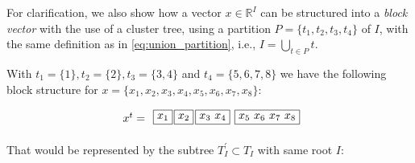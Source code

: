 For clarification, we also show how a vector $x \in \mathbb{R}^{I}$ can be structured into a \textit{block vector} with the use of a cluster tree, using a partition $P=\{t_{1}, t_{2}, t_{3}, t_{4}\}$ of $I$, with the same definition as in \ref{eq:union_partition}, i.e., $I = \bigcup_{t \in P} t$.

With $t_{1} = \{1\}, t_{2} = \{2\}, t_{3}=\{3,4\}$ and $t_{4}=\{5,6,7,8\}$ we have the following block structure for $x=\{x_{1},x_{2},x_{3},x_{4},x_{5},x_{6},x_{7},x_{8}\}$:

\begin{equation}
    \begin{tikzpicture}[
            grow=right,
            level 1/.style={level distance = 9mm},
            level 2/.style={level distance = 6.5mm},
            level 3/.style={level distance = 9mm},
            level 4/.style={level distance = 17mm}
        ]
        \node {$x^{t} = $}
        child{node[rectangle,draw]{$x_{1}$} edge from parent[draw=none]
                child{node[rectangle,draw]{$x_{2}$}edge from parent[draw=none]
                        child{
                                node[rectangle,draw]{$x_{3}$ $x_{4}$} edge from parent[draw=none]
                                child{
                                        node[rectangle,draw]{$x_{5}$ $x_{6}$ $x_{7}$ $x_{8}$} edge from parent[draw=none]
                                    }
                            }
                    }
            }
        ;
    \end{tikzpicture}
\end{equation}

That would be represented by the subtree $T_{I} ^{'} \subset T_{I}$ with same root $I$:

